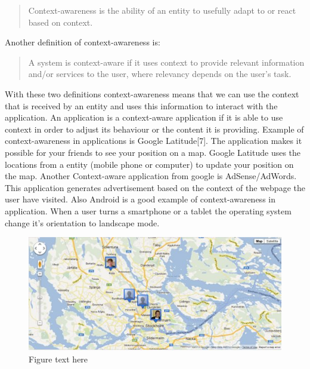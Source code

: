 \begin{quotation}
Context-awareness is the ability of an entity to usefully adapt to or react based on context. 
\end{quotation}

Another definition of context-awareness is:

\begin{quotation}
A system is context-aware if it uses context to provide relevant information and\slash or services to the user, where relevancy depends on the user's task.
\end{quotation}

With these two definitions context-awareness means that we can use the context that is received by an entity and uses this information to interact with the application. An application is a context-aware application if it is able to use context in order to adjust its behaviour or the content it is providing. Example of context-awareness in applications is Google Latitude[7]. The application makes it possible for your friends to see your position on a map. Google Latitude uses the locations from a entity (mobile phone or computer) to update your position on the map. Another Context-aware application from google is AdSense\slash AdWords. This application generates advertisement based on the context of the webpage the user have visited. 
Also Android is a good example of context-awareness in application. When a user turns a smartphone or a tablet the operating system change 
it's orientation to landscape mode.

\begin{figure}[t]
	\centering
    	\includegraphics[scale=0.75]{context_awareness/latitude_pic.jpg}
		\caption{Figure text here} 
\end{figure}

